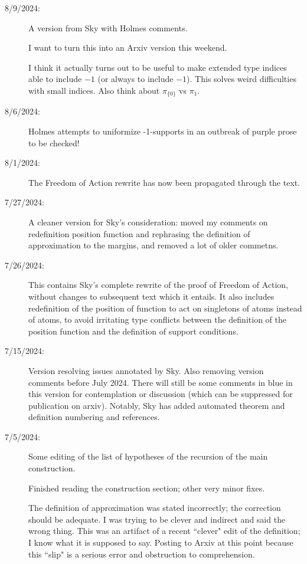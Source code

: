 \documentclass[112pt]{article}
\theoremstyle{definition}
\theoremstyle{remark}
\newcommand{\hsuggest}[1]{{\color{magenta}#1}}
\begin{document}
\begin{description}
\item[8/9/2024:]  A version from Sky with Holmes comments.

I want to turn this into an Arxiv version this weekend.

I think it actually turns out to be useful to make extended type indices able to include $-1$ (or always to include $-1$).
This solves weird difficulties with small indices.  Also think about $\pi_{\{0\}}$ vs $\pi_1$.

\item[8/6/2024:]  Holmes attempts to uniformize -1-supports in an outbreak of \hsuggest{purple prose} to be checked!

\item[8/1/2024:]  The Freedom of Action rewrite has now been propagated through the text.

\item[7/27/2024:]  A cleaner version for Sky's consideration:  moved my comments on redefinition position function and rephrasing the definition of approximation to the margins, and removed a lot of older commetns.

\item[7/26/2024:]  This contains Sky's complete rewrite of the proof of Freedom of Action, without changes to subsequent text which it entails.  It also includes
redefinition of the position of function to act on singletons of atoms instead of atoms, to avoid irritating type conflicts between the definition of the position function
and the definition of support conditions.

\item[7/15/2024:]  Version resolving issues annotated by Sky.  Also removing version comments before July 2024.  There will still be some comments in blue in this version for contemplation or discussion (which can be suppressed for publication on arxiv).  Notably, Sky has added automated theorem and definition numbering and references.

\item[7/5/2024:]  Some editing of the list of hypotheses of the recursion of the main construction.

Finished reading the construction section;  other very minor fixes.

The definition of approximation was stated incorrectly;  the correction should be adequate.  I was trying to be clever and indirect and said the wrong thing.  This was an artifact of a recent ``clever" edit of the definition; I know what it is supposed to say.  Posting to Arxiv at this point because this ``slip" is a serious error and obstruction to comprehension.


\end{description}
\end{document}
